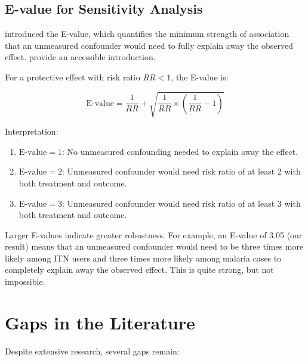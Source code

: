 \subsection{E-value for Sensitivity Analysis}

\citet{vanderweele2017sensitivity} introduced the E-value, which quantifies the minimum strength of association that an unmeasured confounder would need to fully explain away the observed effect. \citet{chung2023evalue} provide an accessible introduction.

For a protective effect with risk ratio $RR < 1$, the E-value is:

\[
\text{E-value} = \frac{1}{RR} + \sqrt{\frac{1}{RR} \times \left(\frac{1}{RR} - 1\right)}
\]

Interpretation:

\begin{enumerate}
	\item $\text{E-value} = 1$: No unmeasured confounding needed to explain away the effect.
	\item $\text{E-value} = 2$: Unmeasured confounder would need risk ratio of at least 2 with both treatment and outcome.
	\item $\text{E-value} = 3$: Unmeasured confounder would need risk ratio of at least 3 with both treatment and outcome.
\end{enumerate}

Larger E-values indicate greater robustness. For example, an E-value of 3.05 (our result) means that an unmeasured confounder would need to be three times more likely among ITN users and three times more likely among malaria cases to completely explain away the observed effect. This is quite strong, but not impossible.

\section{Gaps in the Literature}

Despite extensive research, several gaps remain:

